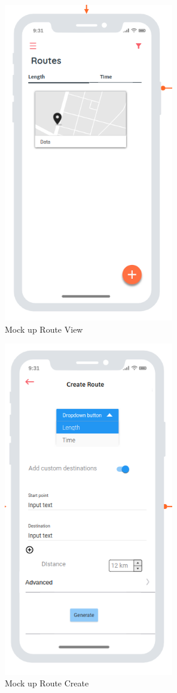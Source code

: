     \begin{figure}[htbp]
        \includegraphics[width=20em]{./graphics/routeView_Mockup.png}
        \centering
        \caption{Mock up Route View}
        \label{fig:routeViewMockup}
    \end{figure}

    \begin{figure}[htbp]
        \includegraphics[width=20em]{./graphics/createRoute_Mockup.png}
        \centering
        \caption{Mock up Route Create}
        \label{fig:createRouteMockup}
    \end{figure}

